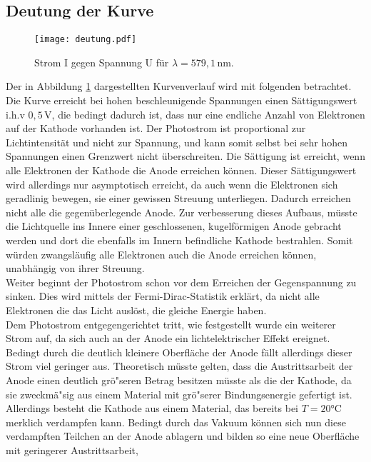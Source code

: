  \subsection{Deutung der Kurve }
 \begin{figure}[H]
  \centering
  \texttt{[image: deutung.pdf]}
  \caption{Strom I gegen Spannung U für  $\lambda = 579,1  \, \text{nm}$.}
  \label{fig:deutung}
\end{figure}
\noindent
 Der in Abbildung \ref{fig:deutung} dargestellten Kurvenverlauf wird mit folgenden betrachtet. \\
 Die Kurve erreicht bei hohen beschleunigende Spannungen einen  Sättigungswert  i.h.v $0,5\, \text{V}$, die bedingt dadurch ist, 
dass nur eine endliche Anzahl von Elektronen auf der Kathode vorhanden ist.
Der Photostrom ist proportional zur Lichtintensität und nicht zur Spannung, 
und kann somit selbst bei sehr hohen Spannungen einen Grenzwert nicht überschreiten. 
Die Sättigung ist erreicht, wenn alle Elektronen der Kathode die Anode erreichen können.
Dieser Sättigungswert wird allerdings nur asymptotisch erreicht,
da auch wenn die Elektronen sich geradlinig bewegen, sie einer gewissen Streuung unterliegen. 
Dadurch erreichen nicht alle die gegenüberlegende Anode. 
Zur verbesserung dieses Aufbaus, müsste die Lichtquelle ins Innere einer geschlossenen, kugelförmigen Anode 
gebracht werden und dort die ebenfalls im Innern befindliche Kathode bestrahlen. 
Somit würden zwangsläufig alle Elektronen auch die Anode erreichen können, unabhängig von ihrer Streuung. \\
Weiter beginnt der Photostrom schon vor dem Erreichen der Gegenspannung zu sinken.
 Dies wird mittels der Fermi-Dirac-Statistik erklärt, da nicht alle Elektronen die das Licht auslöst,
  die gleiche Energie haben. \\
Dem Photostrom entgegengerichtet tritt, wie festgestellt wurde ein weiterer Strom auf,
 da sich auch an der Anode ein lichtelektrischer Effekt ereignet.
 Bedingt durch die deutlich kleinere Oberfläche der Anode fällt allerdings dieser Strom viel geringer aus. 
 Theoretisch müsste gelten, dass die Austrittsarbeit der Anode einen deutlich grö"seren Betrag besitzen müsste als die der Kathode,
  da sie zweckmä"sig aus einem Material mit grö"serer Bindungsenergie gefertigt ist. 
  Allerdings besteht die Kathode aus einem Material, das bereits bei $T= 20° \text{C}$ merklich verdampfen kann.
Bedingt durch das Vakuum können sich nun diese verdampften Teilchen an der Anode ablagern und bilden so eine neue Oberfläche mit geringerer Austrittsarbeit, 
